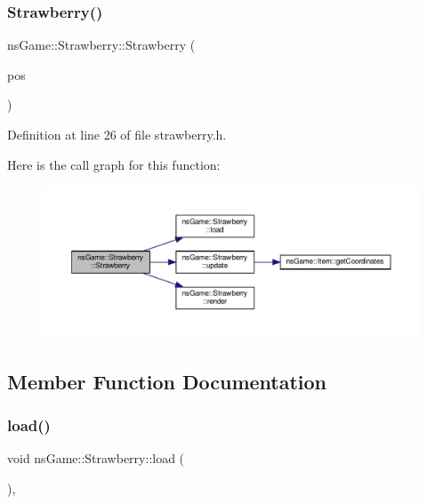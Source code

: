\subsubsection{\texorpdfstring{Strawberry()}{Strawberry()}}
{\footnotesize\ttfamily ns\+Game\+::\+Strawberry\+::\+Strawberry (\begin{DoxyParamCaption}\item[{ns\+Graphics\+::\+Vec2D}]{pos }\end{DoxyParamCaption})\hspace{0.3cm}{\ttfamily [inline]}}



Definition at line 26 of file strawberry.\+h.

Here is the call graph for this function\+:
\nopagebreak
\begin{figure}[H]
\begin{center}
\leavevmode
\includegraphics[width=350pt]{classns_game_1_1_strawberry_abeb99e75e7bf444bb88973492a5266db_cgraph}
\end{center}
\end{figure}


\subsection{Member Function Documentation}
\mbox{\label{classns_game_1_1_strawberry_a0db46752979078f7bc64703425887ff5}} 
\subsubsection{\texorpdfstring{load()}{load()}}
{\footnotesize\ttfamily void ns\+Game\+::\+Strawberry\+::load (\begin{DoxyParamCaption}{ }\end{DoxyParamCaption})\hspace{0.3cm}{\ttfamily [override]}, {\ttfamily [virtual]}}



